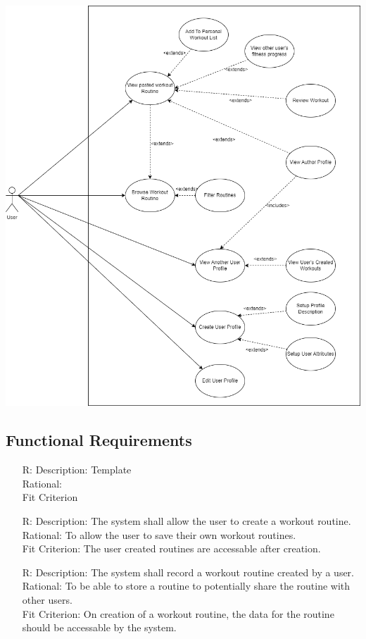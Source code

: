 \documentclass[12pt]{article}
\newcounter{reqnum} %
\begin{document}
\begin{itemize}
	\includegraphics[scale=0.5]{srs_usecase_diagram_profiles}
	
	\subsection{Functional Requirements}
	\noindent \begin{itemize}
		
		\item[R\refstepcounter{reqnum}\thereqnum \label{R_Inputs}:]
		Description: Template
		\\ Rational:
		\\ Fit Criterion
		
		\item[R\refstepcounter{reqnum}\thereqnum \label{R_Inputs}:]
		Description: The system shall allow the user to create a workout routine.
		\\ Rational: To allow the user to save their own workout routines.
		\\ Fit Criterion: The user created routines are accessable after creation.
		
		\item[R\refstepcounter{reqnum}\thereqnum \label{R_Inputs}:]
		Description: The system shall record a workout routine created by a user. 
		\\ Rational: To be able to store a routine to potentially share the routine with
		other users.
		\\ Fit Criterion: On creation of a workout routine, the data for the routine
		should be accessable by the system.
		

\end{itemize}
\end{itemize}
\end{document}
